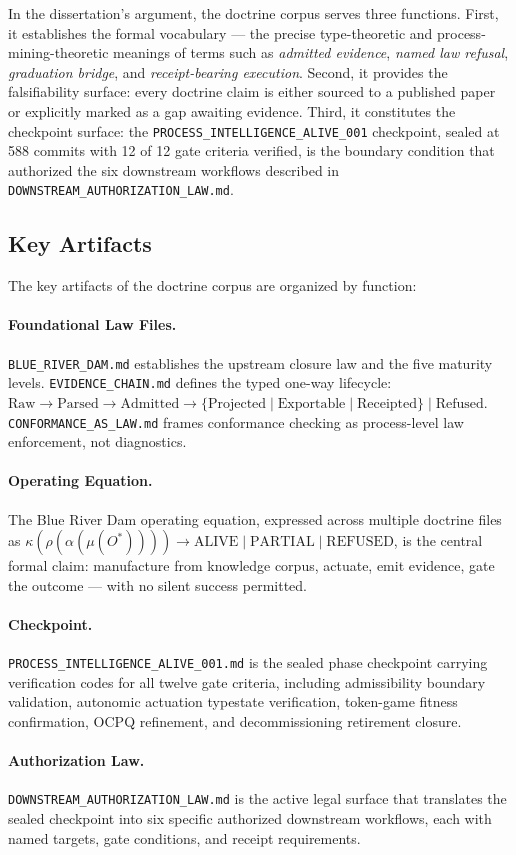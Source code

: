 In the dissertation's argument, the doctrine corpus serves three functions. First, it
establishes the formal vocabulary --- the precise type-theoretic and process-mining-theoretic
meanings of terms such as \emph{admitted evidence}, \emph{named law refusal},
\emph{graduation bridge}, and \emph{receipt-bearing execution}. Second, it provides the
falsifiability surface: every doctrine claim is either sourced to a published paper or
explicitly marked as a gap awaiting evidence. Third, it constitutes the checkpoint surface:
the \texttt{PROCESS\_INTELLIGENCE\_ALIVE\_001} checkpoint, sealed at 588 commits with 12 of
12 gate criteria verified, is the boundary condition that authorized the six downstream
workflows described in \texttt{DOWNSTREAM\_AUTHORIZATION\_LAW.md}.

\subsection{Key Artifacts}
\label{sec:doctrine-identity-artifacts}

The key artifacts of the doctrine corpus are organized by function:

\paragraph{Foundational Law Files.} \texttt{BLUE\_RIVER\_DAM.md} establishes the upstream
closure law and the five maturity levels. \texttt{EVIDENCE\_CHAIN.md} defines the typed
one-way lifecycle: $\text{Raw} \to \text{Parsed} \to \text{Admitted} \to
\{\text{Projected} \mid \text{Exportable} \mid \text{Receipted}\} \mid \text{Refused}$.
\texttt{CONFORMANCE\_AS\_LAW.md} frames conformance checking as process-level law
enforcement, not diagnostics.

\paragraph{Operating Equation.} The Blue River Dam operating equation, expressed across
multiple doctrine files as $\kappa(\rho(\alpha(\mu(O^*)))) \to \text{ALIVE} \mid
\text{PARTIAL} \mid \text{REFUSED}$, is the central formal claim: manufacture from knowledge
corpus, actuate, emit evidence, gate the outcome --- with no silent success permitted.

\paragraph{Checkpoint.} \texttt{PROCESS\_INTELLIGENCE\_ALIVE\_001.md} is the sealed phase
checkpoint carrying verification codes for all twelve gate criteria, including admissibility
boundary validation, autonomic actuation typestate verification, token-game fitness
confirmation, OCPQ refinement, and decommissioning retirement closure.

\paragraph{Authorization Law.} \texttt{DOWNSTREAM\_AUTHORIZATION\_LAW.md} is the active
legal surface that translates the sealed checkpoint into six specific authorized downstream
workflows, each with named targets, gate conditions, and receipt requirements.
